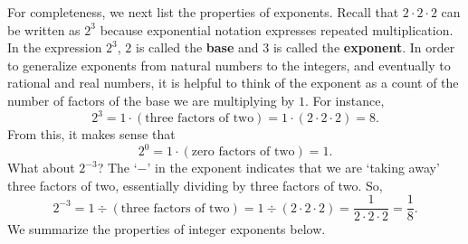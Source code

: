 \smallskip

For completeness, we next list the properties of exponents.   Recall that $2 \cdot 2 \cdot 2$  can be written as $2^3$ because exponential notation expresses repeated multiplication.  In the expression $2^3$, $2$ is called the \textbf{base} and $3$ is called the \textbf{exponent}. In order to generalize exponents from natural numbers to the integers, and eventually to rational and real numbers, it is helpful to think of the exponent as a count of the number of factors of the base we are multiplying by $1$.  For instance, \[2^3 = 1 \cdot (\text{three factors of two}) = 1 \cdot (2 \cdot 2 \cdot 2) = 8.\] From this, it makes sense that \[2^{0} = 1 \cdot (\text{zero factors of two}) = 1.\]  What about $2^{-3}$?  The `$-$' in the exponent indicates that we are `taking away' three factors of two, essentially dividing by three factors of two.  So, \[2^{-3} = 1 \div (\text{three factors of two}) = 1 \div (2 \cdot 2 \cdot 2) = \frac{1}{2 \cdot 2 \cdot 2} = \frac{1}{8}.\]  We summarize the properties of integer exponents below.

\medskip


